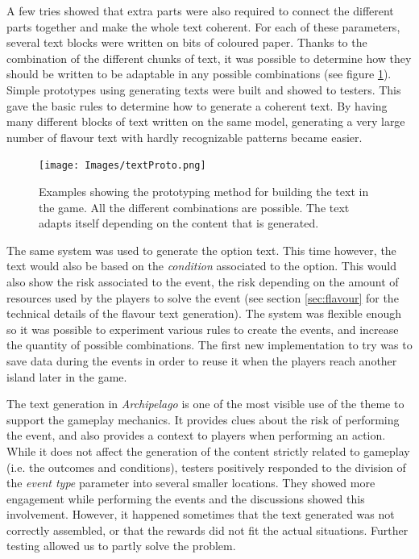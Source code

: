 A few tries showed that extra parts were also required to connect the different parts together and make the whole text coherent. For each of these parameters, several text blocks were written on bits of coloured paper. Thanks to the combination of the different chunks of text, it was possible to determine how they should be written to be adaptable in any possible combinations (see figure \ref{fig:textproto}). Simple prototypes using generating texts were built and showed to testers. This gave the basic rules to determine how to generate a coherent text. By having many different blocks of text written on the same model, generating a very large number of flavour text with hardly recognizable patterns became easier. 

\begin{figure}[!ht]
    \centering
    \texttt{[image: Images/textProto.png]}
    \caption{Examples showing the prototyping method for building the text in the game. All the different combinations are possible. The text adapts itself depending on the content that is generated.}
    \label{fig:textproto}
\end{figure}

The same system was used to generate the option text. This time however, the text would also be based on the \textit{condition} associated to the option. This would also show the risk associated to the event, the risk depending on the amount of resources used by the players to solve the event (see section \ref{sec:flavour} for the technical details of the flavour text generation). The system was flexible enough so it was possible to experiment various rules to create the events, and increase the quantity of possible combinations. The first new implementation to try was to save data during the events in order to reuse it when the players reach another island later in the game.

The text generation in \textit{Archipelago} is one of the most visible use of the theme to support the gameplay mechanics. It provides clues about the risk of performing the event, and also provides a context to players when performing an action. While it does not affect the generation of the content strictly related to gameplay (i.e. the outcomes and conditions), testers positively responded to the division of the \textit{event type} parameter into several smaller locations. They showed more engagement while performing the events and the discussions showed this involvement. However, it happened sometimes that the text generated was not correctly assembled, or that the rewards did not fit the actual situations. Further testing allowed us to partly solve the problem.
